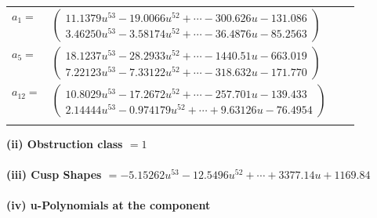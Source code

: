 \documentclass[1p]{elsarticle_modified}
\theoremstyle{definition}
\begin{document}
\begin{tabular}{m{7pt} m{180pt} m{7pt} m{180pt} }
\flushright $a_{1}=$&$\begin{pmatrix}11.1379 u^{53}-19.0066 u^{52}+\cdots-300.626 u-131.086\\3.46250 u^{53}-3.58174 u^{52}+\cdots-36.4876 u-85.2563\end{pmatrix}$ \\
\flushright $a_{5}=$&$\begin{pmatrix}18.1237 u^{53}-28.2933 u^{52}+\cdots-1440.51 u-663.019\\7.22123 u^{53}-7.33122 u^{52}+\cdots-318.632 u-171.770\end{pmatrix}$ \\
\flushright $a_{12}=$&$\begin{pmatrix}10.8029 u^{53}-17.2672 u^{52}+\cdots-257.701 u-139.433\\2.14444 u^{53}-0.974179 u^{52}+\cdots+9.63126 u-76.4954\end{pmatrix}$\\&\end{tabular}
\flushleft \textbf{(ii) Obstruction class $= 1$}\\~\\
\flushleft \textbf{(iii) Cusp Shapes $= -5.15262 u^{53}-12.5496 u^{52}+\cdots+3377.14 u+1169.84$}\\~\\
\newpage\renewcommand{\arraystretch}{1}
\flushleft \textbf{(iv) u-Polynomials at the component}\newline \\
\end{document}
